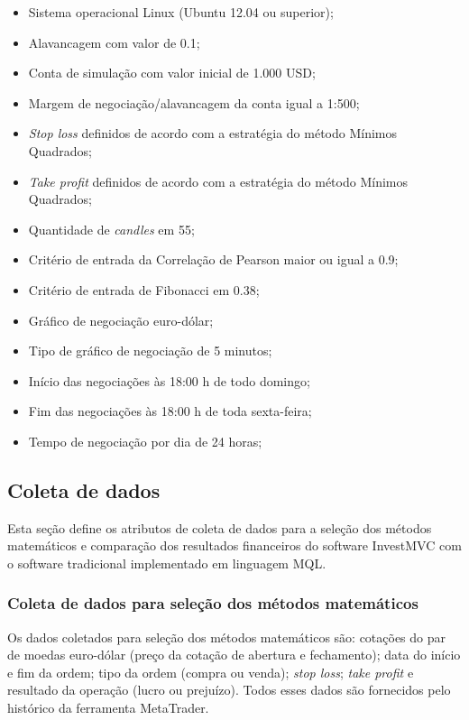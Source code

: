\begin{itemize}
\item Sistema operacional Linux (Ubuntu 12.04 ou superior);
\item Alavancagem com valor de 0.1;
\item Conta de simulação com valor inicial de 1.000 USD;
\item Margem de negociação/alavancagem da conta igual a 1:500;
\item \textit{Stop loss} definidos de acordo com a estratégia do método Mínimos Quadrados;
\item \textit{Take profit} definidos de acordo com a estratégia do método Mínimos Quadrados;
\item Quantidade de \textit{candles} em 55;
\item Critério de entrada da Correlação de Pearson maior ou igual a 0.9;
\item Critério de entrada de Fibonacci em 0.38;
\item Gráfico de negociação euro-dólar;
\item Tipo de gráfico de negociação de 5 minutos;
\item Início das negociações às 18:00 h de todo domingo;
\item Fim das negociações às 18:00 h de toda sexta-feira;
\item Tempo de negociação por dia de 24 horas;
\end{itemize}

\subsection{Coleta de dados}
Esta seção define os atributos de coleta de dados para a seleção dos métodos matemáticos e comparação dos resultados financeiros do software InvestMVC com o software tradicional implementado em linguagem MQL.

\subsubsection{Coleta de dados para seleção dos métodos matemáticos}
Os dados coletados para seleção dos métodos matemáticos são: cotações do par de moedas euro-dólar (preço da cotação de abertura e fechamento); data do início e fim da ordem; tipo da ordem (compra ou venda); \textit{stop loss}; \textit{take profit} e resultado da operação (lucro ou prejuízo). Todos esses dados são fornecidos pelo histórico da ferramenta MetaTrader.

